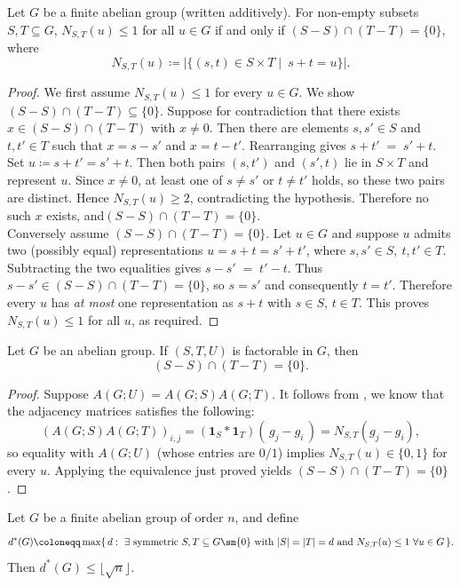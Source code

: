 \documentclass{file}
\begin{document}
\begin{lem}\label{lem:sidon-pair}
Let $G$ be a finite abelian group (written additively). For non-empty subsets $S,T\subseteq G$, 
$N_{S,T}(u)\le 1$ for all $u\in G$
if and only if 
$(S-S)\cap(T-T)=\{0\}$,
where $$N_{S,T}(u)\coloneqq \bigl|\{(s,t)\in S\times T\mid \ s+t=u\}\bigr|.$$
\end{lem}

\begin{proof}
We first assume $N_{S,T}(u)\le 1$ for every $u\in G$. We show $(S-S)\cap(T-T)\subseteq\{0\}$.
Suppose for contradiction that there exists $x\in(S-S)\cap(T-T)$ with $x\ne 0$. Then there are elements
$s,s'\in S$ and $t,t'\in T$ such that
$x=s-s'$ and $x=t-t'$.
Rearranging  gives
$s+t' \;=\; s'+t$.
Set $u\coloneqq s+t'=s'+t$. Then both pairs $(s,t')$ and $(s',t)$ lie in $S\times T$ and represent $u$.
Since $x\neq 0$, at least one of $s\ne s'$ or $t\ne t'$ holds, so these two pairs are distinct.
Hence $N_{S,T}(u)\ge 2$, contradicting the hypothesis. Therefore no such $x$ exists, and$(S-S)\cap(T-T)=\{0\}$.\\
Conversely assume $(S-S)\cap(T-T)=\{0\}$. Let $u\in G$ and suppose $u$ admits two (possibly equal) representations
$u=s+t=s'+t'$, where $s,s'\in S,\ t,t'\in T$.
Subtracting the two equalities gives
$s-s' \;=\; t'-t$.
Thus $s-s'\in (S-S)\cap(T-T)=\{0\}$, so $s=s'$ and consequently $t=t'$.
Therefore every $u$ has \emph{at most} one representation as $s+t$ with $s\in S$, $t\in T$.
This proves $N_{S,T}(u)\le 1$ for all $u$, as required.
\end{proof}

\begin{cor}
Let $G$ be an abelian group.
If $(S,T,U)$ is factorable in $G$, then $$(S-S)\cap(T-T)=\{0\}.$$ 
\end{cor}

\begin{proof}
Suppose $A(G;U)=A(G;S)A(G;T)$.
It follows from , we know that the adjacency matrices satisfies the following:
\[
(A(G;S)A(G;T))_{i,j}
= (\mathbf 1_S * \mathbf 1_T)(\,g_j-g_i\,)
= N_{S,T}(g_j-g_i),
\]
so equality with $A(G;U)$ (whose entries are $0/1$) implies $N_{S,T}(u)\in\{0,1\}$ for every $u$.
Applying the equivalence just proved yields $(S-S)\cap(T-T)=\{0\}$.
\end{proof}

\begin{thm}
Let $G$ be a finite abelian group of order $n$, and define
\[
d^*(G)\coloneqq \max\{\,d:\ \exists\ \text{symmetric }S,T\subseteq G\sm \{0\}\ \text{with }|S|=|T|=d
\ \text{and }N_{S,T}(u)\le 1\ \forall u\in G\,\}.
\]
Then $d^*(G)\le \lfloor \sqrt{n}\rfloor$. 
\end{thm}
\end{document}
